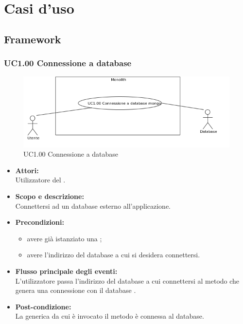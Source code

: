 \section{Casi d'uso}

\subsection{Framework}

\subsubsection{UC1.00 Connessione a database } \label{UC1.00}

\begin{figure}[H]
	\centering
	\includegraphics[width=15cm]{../../documenti/AnalisiDeiRequisiti/Diagrammi_img/uc1_00.png}
	\caption{UC1.00 Connessione a database }
\end{figure}

\begin{itemize}
\item \textbf{Attori:}
\\Utilizzatore del .
\item \textbf{Scopo e descrizione:} 
\\Connettersi ad un database  esterno all'applicazione.
\item \textbf{Precondizioni:}
	\begin{itemize}
		\item avere già istanziato una ;
		\item avere l'indirizzo del database  a cui si desidera connettersi.
	\end{itemize}
\item \textbf{Flusso principale degli eventi:}
\\L'utilizzatore passa l'indirizzo del database a cui connettersi al metodo che genera una connessione con il database .
\item \textbf{Post-condizione:}
\\La {} generica da cui è invocato il metodo è connessa al database.
\end{itemize}

